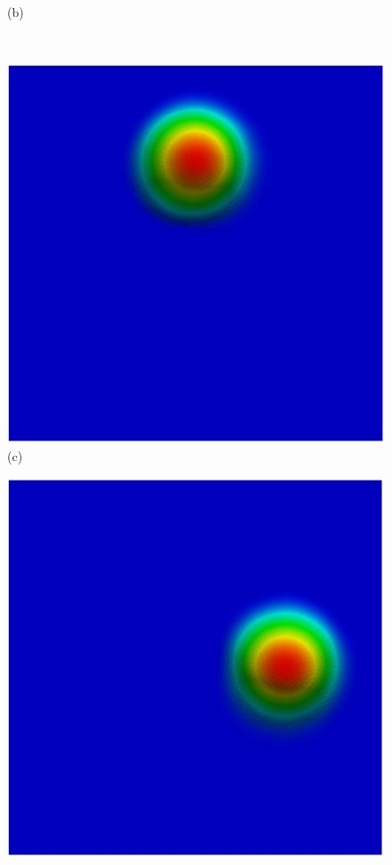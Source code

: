 \begin{figure}[H]
\begin{minipage}{.5\linewidth}
      (b)
     \end{minipage}\\[10pt]
     \begin{minipage}{.5\linewidth}
      \centering
      \includegraphics[scale=0.42]{./02_chaps/cap_validation/figure/figSLquad2.png}\\
      (c)
     \end{minipage}%
     \begin{minipage}{.5\linewidth}
      \centering
      \includegraphics[scale=0.42]{./02_chaps/cap_validation/figure/figSLquad3.png}\\

\end{minipage}
\end{figure}
